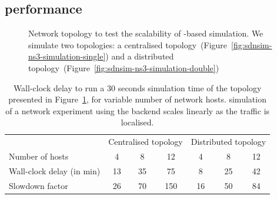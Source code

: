 \subsection{ performance} \label{sec:sdnsim-ns3-perf}

\begin{figure}[ht]
\caption[ scalability evaluation topology]{Network topology to test the scalability of -based simulation. We
simulate two topologies: a centralised
topology~(Figure~\ref{fig:sdnsim-ns3-simulation-single}) and a distributed
topology~(Figure~\ref{fig:sdnsim-ns3-simulation-double})}
\label{fig:sdnsim-ns3-simulation}
\end{figure}

\begin{table}
\begin{center}
\begin{tabular}{|l|c|c|c|c|c|c|} \hline
&\multicolumn{3}{|c|}{Centralised topology} & \multicolumn{3}{|c|}{Distributed
  topology} \\
\cline{2-7}
Number of hosts & 4 & 8 & 12 & 4 & 8 & 12 \\
\hline 
Wall-clock delay (in min) & 13 & 35 & 75 & 8 & 25 & 42 \\
\hline
Slowdown factor & 26 & 70 & 150 & 16 & 50 & 84 \\
\hline 
\end{tabular}
\end{center}
\caption[\sdnsim {} backend evaluation result]{Wall-clock delay to run a 30 seconds simulation time of the topology
  presented in Figure~\ref{fig:sdnsim-ns3-simulation}, for variable number of network hosts. 
  \sdnsim simulation of a network experiment using the  backend
  scales linearly as the traffic is localised. }
\label{tbl:sdnsim-ns3-simulation-results}
\end{table}

